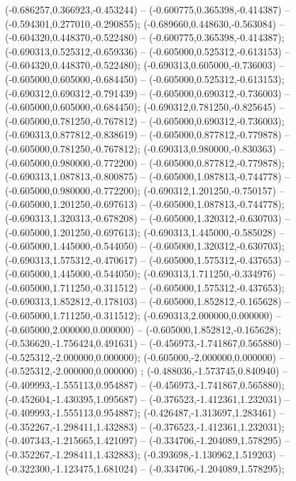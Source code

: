  (-0.686257,0.366923,-0.453244) -- (-0.600775,0.365398,-0.414387) -- (-0.594301,0.277010,-0.290855);
 (-0.689660,0.448630,-0.563084) -- (-0.604320,0.448370,-0.522480) -- (-0.600775,0.365398,-0.414387);
 (-0.690313,0.525312,-0.659336) -- (-0.605000,0.525312,-0.613153) -- (-0.604320,0.448370,-0.522480);
 (-0.690313,0.605000,-0.736003) -- (-0.605000,0.605000,-0.684450) -- (-0.605000,0.525312,-0.613153);
 (-0.690312,0.690312,-0.791439) -- (-0.605000,0.690312,-0.736003) -- (-0.605000,0.605000,-0.684450);
 (-0.690312,0.781250,-0.825645) -- (-0.605000,0.781250,-0.767812) -- (-0.605000,0.690312,-0.736003);
 (-0.690313,0.877812,-0.838619) -- (-0.605000,0.877812,-0.779878) -- (-0.605000,0.781250,-0.767812);
 (-0.690313,0.980000,-0.830363) -- (-0.605000,0.980000,-0.772200) -- (-0.605000,0.877812,-0.779878);
 (-0.690313,1.087813,-0.800875) -- (-0.605000,1.087813,-0.744778) -- (-0.605000,0.980000,-0.772200);
 (-0.690312,1.201250,-0.750157) -- (-0.605000,1.201250,-0.697613) -- (-0.605000,1.087813,-0.744778);
 (-0.690313,1.320313,-0.678208) -- (-0.605000,1.320312,-0.630703) -- (-0.605000,1.201250,-0.697613);
 (-0.690313,1.445000,-0.585028) -- (-0.605000,1.445000,-0.544050) -- (-0.605000,1.320312,-0.630703);
 (-0.690313,1.575312,-0.470617) -- (-0.605000,1.575312,-0.437653) -- (-0.605000,1.445000,-0.544050);
 (-0.690313,1.711250,-0.334976) -- (-0.605000,1.711250,-0.311512) -- (-0.605000,1.575312,-0.437653);
 (-0.690313,1.852812,-0.178103) -- (-0.605000,1.852812,-0.165628) -- (-0.605000,1.711250,-0.311512);
 (-0.690313,2.000000,0.000000) -- (-0.605000,2.000000,0.000000) -- (-0.605000,1.852812,-0.165628);
 (-0.536620,-1.756424,0.491631) -- (-0.456973,-1.741867,0.565880) -- (-0.525312,-2.000000,0.000000);
 (-0.605000,-2.000000,0.000000) -- (-0.525312,-2.000000,0.000000) ;
 (-0.488036,-1.573745,0.840940) -- (-0.409993,-1.555113,0.954887) -- (-0.456973,-1.741867,0.565880);
 (-0.452604,-1.430395,1.095687) -- (-0.376523,-1.412361,1.232031) -- (-0.409993,-1.555113,0.954887);
 (-0.426487,-1.313697,1.283461) -- (-0.352267,-1.298411,1.432883) -- (-0.376523,-1.412361,1.232031);
 (-0.407343,-1.215665,1.421097) -- (-0.334706,-1.204089,1.578295) -- (-0.352267,-1.298411,1.432883);
 (-0.393698,-1.130962,1.519203) -- (-0.322300,-1.123475,1.681024) -- (-0.334706,-1.204089,1.578295);
